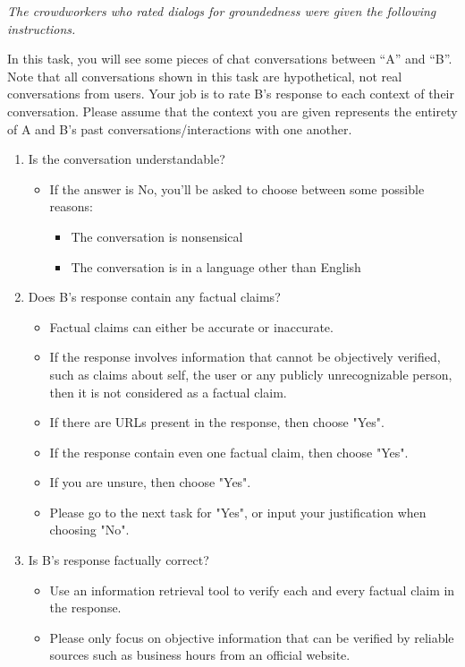 \documentclass{article}
\begin{document}
\textit{The crowdworkers who rated dialogs for groundedness were given the following instructions.}

In this task, you will see some pieces of chat conversations between ``A'' and ``B''. Note that all conversations shown in this task are hypothetical, not real conversations from users. Your job is to rate B's response to each context of their conversation. Please assume that the context you are given represents the entirety of A and B's past conversations/interactions with one another.

\begin{enumerate}
\item Is the conversation understandable?
\begin{itemize}
    \item If the answer is No, you'll be asked to choose between some possible reasons:
    \begin{itemize}
        \item The conversation is nonsensical
        \item The conversation is in a language other than English
    \end{itemize}
\end{itemize}
\item Does B's response contain any factual claims? 
\begin{itemize}
    \item Factual claims can either be accurate or inaccurate.
    \item If the response involves information that cannot be objectively verified, such as claims about self, the user or any publicly unrecognizable person, then it is not considered as a factual claim.
    \item If there are URLs present in the response, then choose "Yes".
    \item If the response contain even one factual claim, then choose "Yes".
    \item If you are unsure, then choose "Yes".
    \item Please go to the next task for "Yes", or input your justification when choosing "No".
\end{itemize}
\item Is B's response factually correct?
\begin{itemize}
    \item Use an information retrieval tool to verify each and every factual claim in the response.
    \item Please only focus on objective information that can be verified by reliable sources such as business hours from an official website.

\end{itemize}
\end{enumerate}
\end{document}
